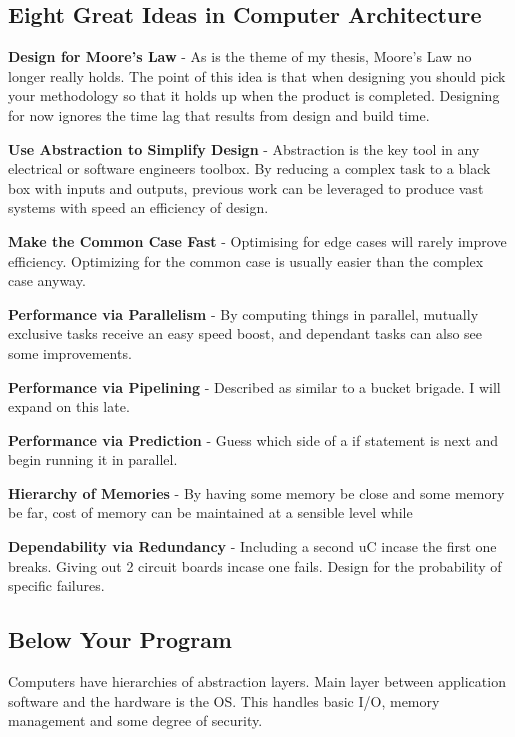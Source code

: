 \documentclass{article}
\begin{document}
		\subsection{Eight Great Ideas in Computer Architecture}
			\begin{description}
				\item \textbf{Design for Moore's Law} - As is the theme of my thesis, Moore's Law no longer really holds. The point of this idea is that when designing you should pick your methodology so that it holds up when the product is completed. Designing for now ignores the time lag that results from design and build time.
				\item \textbf{Use Abstraction to Simplify Design} - Abstraction is the key tool in any electrical or software engineers toolbox. By reducing a complex task to a black box with inputs and outputs, previous work can be leveraged to produce vast systems with speed an efficiency of design.
				\item \textbf{Make the Common Case Fast} - Optimising for edge cases will rarely improve efficiency. Optimizing for the common case is usually easier than the complex case anyway.
				\item \textbf{Performance via Parallelism} - By computing things in parallel, mutually exclusive tasks receive an easy speed boost, and dependant tasks can also see some improvements.
				\item \textbf{Performance via Pipelining} - Described as similar to a bucket brigade. I will expand on this late.
				\item \textbf{Performance via Prediction} - Guess which side of a if statement is next and begin running it in parallel.
				\item \textbf{Hierarchy of Memories} - By having some memory be close and some memory be far, cost of memory can be maintained at a sensible level while 
				\item \textbf{Dependability via Redundancy} - Including a second uC incase the first one breaks. Giving out 2 circuit boards incase one fails. Design for the probability of specific failures.
			\end{description}
		\subsection{Below Your Program}
			Computers have hierarchies of abstraction layers. Main layer between application software and the hardware is the OS. This handles basic I/O, memory management and some degree of security.
			
\end{document}
